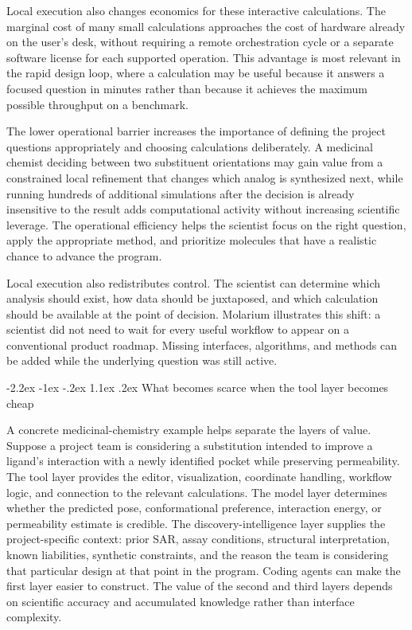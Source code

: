 \documentclass[11pt]{article}
\makeatletter
\renewcommand\section{\@startsection{section}{1}{\z@}%
  {-2.2ex \@plus -1ex \@minus -.2ex}%
  {1.1ex \@plus .2ex}%
  {\normalfont\Large\bfseries\color{molblue}}}
\makeatother
\begin{document}
Local execution also changes economics for these interactive calculations. The marginal cost of many small calculations approaches the cost of hardware already on the user's desk, without requiring a remote orchestration cycle or a separate software license for each supported operation. This advantage is most relevant in the rapid design loop, where a calculation may be useful because it answers a focused question in minutes rather than because it achieves the maximum possible throughput on a benchmark.

The lower operational barrier increases the importance of defining the project questions appropriately and choosing calculations deliberately. A medicinal chemist deciding between two substituent orientations may gain value from a constrained local refinement that changes which analog is synthesized next, while running hundreds of additional simulations after the decision is already insensitive to the result adds computational activity without increasing scientific leverage. The operational efficiency helps the scientist focus on the right question, apply the appropriate method, and prioritize molecules that have a realistic chance to advance the program.

Local execution also redistributes control. The scientist can determine which analysis should exist, how data should be juxtaposed, and which calculation should be available at the point of decision. Molarium illustrates this shift: a scientist did not need to wait for every useful workflow to appear on a conventional product roadmap. Missing interfaces, algorithms, and methods can be added while the underlying question was still active.

\section{What becomes scarce when the tool layer becomes cheap}

A concrete medicinal-chemistry example helps separate the layers of value. Suppose a project team is considering a substitution intended to improve a ligand's interaction with a newly identified pocket while preserving permeability. The tool layer provides the editor, visualization, coordinate handling, workflow logic, and connection to the relevant calculations. The model layer determines whether the predicted pose, conformational preference, interaction energy, or permeability estimate is credible. The discovery-intelligence layer supplies the project-specific context: prior SAR, assay conditions, structural interpretation, known liabilities, synthetic constraints, and the reason the team is considering that particular design at that point in the program. Coding agents can make the first layer easier to construct. The value of the second and third layers depends on scientific accuracy and accumulated knowledge rather than interface complexity.
\end{document}
